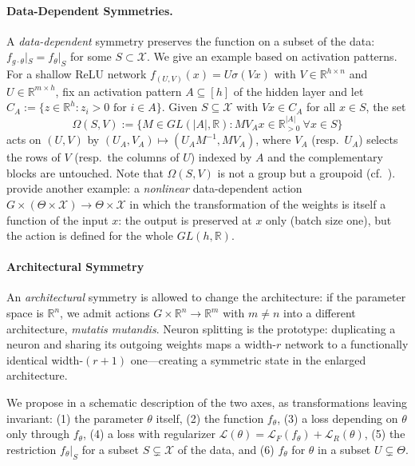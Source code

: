 \documentclass[mathematics,review,submit,moreauthors]{Definitions/mdpi}
\begin{document}
\paragraph{Data-Dependent Symmetries.}
A \emph{data-dependent} symmetry preserves the function on a subset of the data: $f_{g\cdot\theta}|_S=f_\theta|_S$ for some $S\subset\mathcal{X}$.
We give an example based on activation patterns.
For a shallow ReLU network $f_{(U,V)}(x)=U\sigma(Vx)$ with $V\in\mathbb{R}^{h\times n}$ and $U\in\mathbb{R}^{m\times h}$, fix an activation pattern $A\subseteq[h]$ of the hidden layer and let $C_A:=\{z\in\mathbb{R}^h : z_i>0 \text{ for } i\in A\}$.
Given $S\subseteq\mathcal{X}$ with $Vx\in C_A$ for all $x\in S$, the set
\begin{equation*}
    \Omega(S,V):=\big\{M\in GL(|A|,\mathbb{R}) : MV_Ax\in\mathbb{R}^{|A|}_{>0}\ \forall x\in S\big\}
\end{equation*}
acts on $(U,V)$ by $(U_A, V_A)\mapsto(U_AM^{-1}, MV_A)$, where $V_A$ (resp.\ $U_A$) selects the rows of $V$ (resp.\ the columns of $U$) indexed by $A$ and the complementary blocks are untouched.
Note that $\Omega(S,V)$ is not a group but a groupoid (cf.\ ).
\citet{zhao2023a} provide another example: a \emph{nonlinear} data-dependent action $G\times(\Theta\times\mathcal{X})\to\Theta\times\mathcal{X}$ in which the transformation of the weights is itself a function of the input $x$: the output is preserved at $x$ only (batch size one), but the action is defined for the whole $GL(h,\mathbb{R})$.

\paragraph{Architectural Symmetry}
An \emph{architectural} symmetry is allowed to change the architecture: if the parameter space is $\mathbb{R}^n$, we admit actions $G\times\mathbb{R}^n\to\mathbb{R}^m$ with $m\neq n$ into a different architecture, \emph{mutatis mutandis}.
Neuron splitting is the prototype: duplicating a neuron and sharing its outgoing weights maps a width-$r$ network to a functionally identical width-$(r+1)$ one---creating a symmetric state in the enlarged architecture.

We propose in  a schematic description of the two axes, as transformations leaving invariant: (1) the parameter $\theta$ itself, (2) the function $f_\theta$, (3) a loss depending on $\theta$ only through $f_\theta$, (4) a loss with regularizer $\mathcal{L}(\theta)=\mathcal{L}_F(f_\theta)+\mathcal{L}_R(\theta)$, (5) the restriction $f_\theta|_S$ for a subset $S\subsetneq\mathcal{X}$ of the data, and (6) $f_\theta$ for $\theta$ in a subset $U\subsetneq\Theta$.
\end{document}

